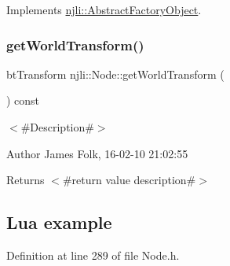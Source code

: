 \begin{DoxyCodeInclude}
\end{DoxyCodeInclude}


Implements \mbox{\hyperlink{classnjli_1_1_abstract_factory_object_a207c86146d40d0794708ae7f2d4e60a7}{njli\+::\+Abstract\+Factory\+Object}}.

\mbox{\label{classnjli_1_1_node_a9db07db4b5fb817d5335d3b31531ffed}} 
\subsubsection{\texorpdfstring{get\+World\+Transform()}{getWorldTransform()}}
{\footnotesize\ttfamily bt\+Transform njli\+::\+Node\+::get\+World\+Transform (\begin{DoxyParamCaption}{ }\end{DoxyParamCaption}) const\hspace{0.3cm}{\ttfamily [inline]}}



$<$\#\+Description\#$>$ 

\begin{DoxyAuthor}{Author}
James Folk, 16-\/02-\/10 21\+:02\+:55
\end{DoxyAuthor}
\begin{DoxyReturn}{Returns}
$<$\#return value description\#$>$
\end{DoxyReturn}
\hypertarget{classnjli_1_1_steering_behavior_wander_ex1}{}\subsection{Lua example}\label{classnjli_1_1_steering_behavior_wander_ex1}

\begin{DoxyCodeInclude}
\end{DoxyCodeInclude}


Definition at line 289 of file Node.\+h.


